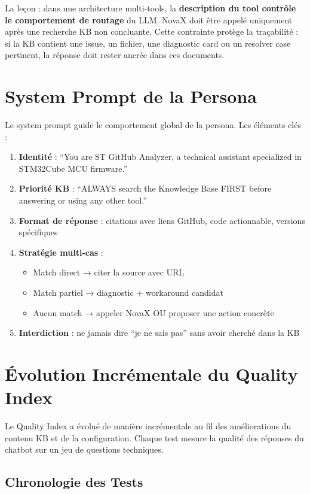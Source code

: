 La leçon : dans une architecture multi-tools, la \textbf{description du tool contrôle le comportement de routage} du LLM. NovaX doit être appelé uniquement après une recherche KB non concluante. Cette contrainte protège la traçabilité : si la KB contient une issue, un fichier, une diagnostic card ou un resolver case pertinent, la réponse doit rester ancrée dans ces documents.

\section{System Prompt de la Persona}

Le system prompt guide le comportement global de la persona. Les éléments clés :

\begin{enumerate}
  \item \textbf{Identité} : ``You are ST GitHub Analyzer, a technical assistant specialized in STM32Cube MCU firmware.''
  \item \textbf{Priorité KB} : ``ALWAYS search the Knowledge Base FIRST before answering or using any other tool.''
  \item \textbf{Format de réponse} : citations avec liens GitHub, code actionnable, versions spécifiques
  \item \textbf{Stratégie multi-cas} :
  \begin{itemize}
    \item Match direct → citer la source avec URL
    \item Match partiel → diagnostic + workaround candidat
    \item Aucun match → appeler NovaX OU proposer une action concrète
  \end{itemize}
  \item \textbf{Interdiction} : ne jamais dire ``je ne sais pas'' sans avoir cherché dans la KB
\end{enumerate}

\section{Évolution Incrémentale du Quality Index}

Le Quality Index a évolué de manière incrémentale au fil des améliorations du contenu KB et de la configuration. Chaque test mesure la qualité des réponses du chatbot sur un jeu de questions techniques.

\subsection{Chronologie des Tests}

